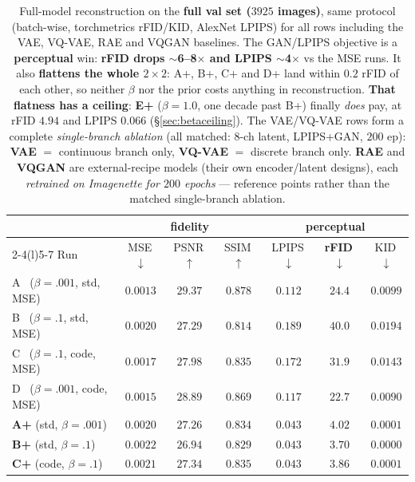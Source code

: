 \documentclass[11pt]{article}
\newcommand{\good}[1]{\textcolor{green!55!black}{#1}}
\begin{document}
\begin{table}[h]
\centering
\caption{Full-model reconstruction on the \textbf{full val set ($3925$ images)}, same protocol
(batch-wise, torchmetrics rFID/KID, AlexNet LPIPS) for all rows including the VAE, VQ-VAE, RAE and
VQGAN baselines. The GAN/LPIPS objective is a \textbf{perceptual} win: \textbf{rFID drops
$\sim$6--8$\times$ and LPIPS $\sim$4$\times$} vs the MSE runs. It also \textbf{flattens the whole
$2\times2$}: A+, B+, C+ and D+ land within $0.2$ rFID of each other, so neither $\beta$ nor the
prior costs anything in reconstruction. \textbf{That flatness has a ceiling}: \textbf{E+}
($\beta{=}1.0$, one decade past B+) finally \emph{does} pay, at rFID $4.94$ and LPIPS $0.066$
(\S\ref{sec:betaceiling}). The VAE/VQ-VAE rows form a complete \emph{single-branch
ablation} (all matched: 8-ch latent, LPIPS+GAN, $200$ ep): \textbf{VAE} $=$ continuous branch only,
\textbf{VQ-VAE} $=$ discrete branch only. \textbf{RAE} and \textbf{VQGAN} are external-recipe
models (their own encoder/latent designs), each \emph{retrained on Imagenette for $200$ epochs}
--- reference points rather than the matched single-branch ablation.}
\label{tab:recon}
\begin{tabular}{lccc ccc}
\toprule
 & \multicolumn{3}{c}{fidelity} & \multicolumn{3}{c}{\textbf{perceptual}}\\
\cmidrule(r){2-4}\cmidrule(l){5-7}
Run & MSE\,$\downarrow$ & PSNR\,$\uparrow$ & SSIM\,$\uparrow$ & LPIPS\,$\downarrow$ & \textbf{rFID}\,$\downarrow$ & KID\,$\downarrow$\\
\midrule
A \ ($\beta{=}.001$, std, MSE) & $0.0013$ & \textbf{$29.37$} & \textbf{$0.878$} & $0.112$ & $24.4$ & $0.0099$\\
B \ ($\beta{=}.1$, std, MSE)   & $0.0020$ & $27.29$ & $0.814$ & $0.189$ & $40.0$ & $0.0194$\\
C \ ($\beta{=}.1$, code, MSE)  & $0.0017$ & $27.98$ & $0.835$ & $0.172$ & $31.9$ & $0.0143$\\
D \ ($\beta{=}.001$, code, MSE)& $0.0015$ & $28.89$ & $0.869$ & $0.117$ & $22.7$ & $0.0090$\\
\midrule
\textbf{A+} (std, $\beta{=}.001$) & $0.0020$ & $27.26$ & $0.834$ & \good{$0.043$} & \good{$4.02$} & \good{$0.0001$}\\
\textbf{B+} (std, $\beta{=}.1$)   & $0.0022$ & $26.94$ & $0.829$ & \good{$0.043$} & \good{$3.70$} & \good{$0.0000$}\\
\textbf{C+} (code, $\beta{=}.1$)  & $0.0021$ & $27.34$ & $0.835$ & \good{$0.043$} & \good{$3.86$} & \good{$0.0001$}\\

\end{tabular}
\end{table}
\end{document}

